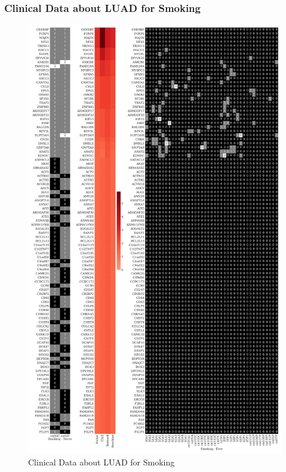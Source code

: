 \documentclass{beamer}
\begin{document}
    \begin{frame}[allowframebreaks]
        \frametitle{Clinical Data about LUAD for Smoking}

        \begin{figure}
            \includegraphics[height=0.6 \textheight]{figures/GeneClinical/BWA-ADC.Smoking.pdf}
            \caption{Clinical Data about LUAD for Smoking}
        \end{figure}


\end{frame}
\end{document}
